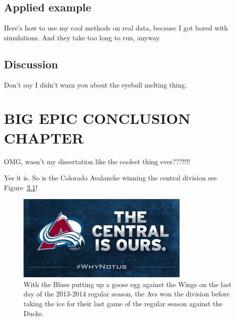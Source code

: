 \documentclass[english]{ucdenver-dissertation}
\begin{document}
\section{Applied example}

Here's how to use my cool methods on real data, because I got bored with 
simulations.  And they take too long to run, anyway.



\section{Discussion}

Don't say I didn't warn you about the eyeball melting thing.

\newpage

\chapter{BIG EPIC CONCLUSION CHAPTER}

OMG, wasn't my dissertation like the coolest thing ever???!!!!

Yes it is.  So is the Colorado Avalanche winning the central division see
Figure~\ref{fig:avs-central-champs}!

\Blindtext

\begin{figure}[H]
  \center
  \includegraphics[width=0.75\textwidth]{avs-central-champs}
  \caption{With the Blues putting up a goose egg against the Wings on the last
    day of the 2013-2014 regular season, the Avs won the division before taking
  the ice for their last game of the regular season against the Ducks.}
  \label{fig:avs-central-champs}
\end{figure}

\blindtext


\renewcommand\bibname{REFERENCES}
\singlespacing





\doublespacing
\end{document}
